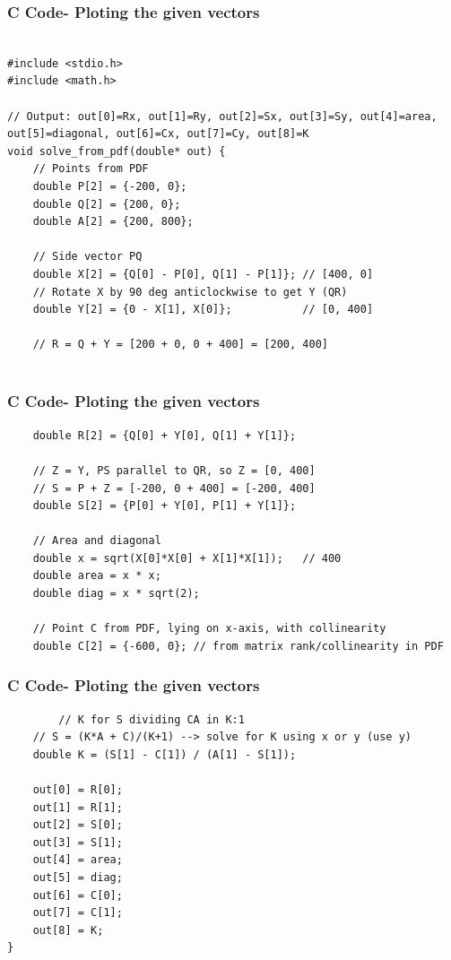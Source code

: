 \documentclass{beamer}
\begin{document}
	
	\begin{frame}[fragile]
	\frametitle{C Code- Ploting the given vectors}
	
	\begin{lstlisting}

#include <stdio.h>
#include <math.h>

// Output: out[0]=Rx, out[1]=Ry, out[2]=Sx, out[3]=Sy, out[4]=area, out[5]=diagonal, out[6]=Cx, out[7]=Cy, out[8]=K
void solve_from_pdf(double* out) {
    // Points from PDF
    double P[2] = {-200, 0};
    double Q[2] = {200, 0};
    double A[2] = {200, 800};

    // Side vector PQ
    double X[2] = {Q[0] - P[0], Q[1] - P[1]}; // [400, 0]
    // Rotate X by 90 deg anticlockwise to get Y (QR)
    double Y[2] = {0 - X[1], X[0]};           // [0, 400]

    // R = Q + Y = [200 + 0, 0 + 400] = [200, 400]
    
	\end{lstlisting}
\end{frame}
\begin{frame}[fragile]
\frametitle{C Code- Ploting the given vectors}
    \begin{lstlisting}
    double R[2] = {Q[0] + Y[0], Q[1] + Y[1]};

    // Z = Y, PS parallel to QR, so Z = [0, 400]
    // S = P + Z = [-200, 0 + 400] = [-200, 400]
    double S[2] = {P[0] + Y[0], P[1] + Y[1]};

    // Area and diagonal
    double x = sqrt(X[0]*X[0] + X[1]*X[1]);   // 400
    double area = x * x;
    double diag = x * sqrt(2);

    // Point C from PDF, lying on x-axis, with collinearity
    double C[2] = {-600, 0}; // from matrix rank/collinearity in PDF
    \end{lstlisting}
\end{frame}
\begin{frame}[fragile]
   \frametitle{C Code- Ploting the given vectors}
    \begin{lstlisting}
        // K for S dividing CA in K:1
    // S = (K*A + C)/(K+1) --> solve for K using x or y (use y)
    double K = (S[1] - C[1]) / (A[1] - S[1]);

    out[0] = R[0];
    out[1] = R[1];
    out[2] = S[0];
    out[3] = S[1];
    out[4] = area;
    out[5] = diag;
    out[6] = C[0];
    out[7] = C[1];
    out[8] = K;
}
    \end{lstlisting}
\end{frame}
\end{document}
